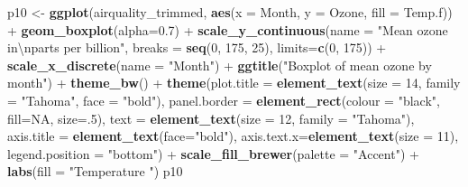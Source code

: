 \documentclass[]{article}
\newenvironment{Shaded}{\begin{snugshade}}{\end{snugshade}}
\newcommand{\KeywordTok}[1]{\textcolor[rgb]{0.13,0.29,0.53}{\textbf{{#1}}}}
\newcommand{\DataTypeTok}[1]{\textcolor[rgb]{0.13,0.29,0.53}{{#1}}}
\newcommand{\DecValTok}[1]{\textcolor[rgb]{0.00,0.00,0.81}{{#1}}}
\newcommand{\FloatTok}[1]{\textcolor[rgb]{0.00,0.00,0.81}{{#1}}}
\newcommand{\CharTok}[1]{\textcolor[rgb]{0.31,0.60,0.02}{{#1}}}
\newcommand{\StringTok}[1]{\textcolor[rgb]{0.31,0.60,0.02}{{#1}}}
\newcommand{\OtherTok}[1]{\textcolor[rgb]{0.56,0.35,0.01}{{#1}}}
\newcommand{\NormalTok}[1]{{#1}}
\begin{document}
\begin{Shaded}
\begin{Highlighting}[]
\NormalTok{p10 <-}\StringTok{ }\KeywordTok{ggplot}\NormalTok{(airquality_trimmed, }\KeywordTok{aes}\NormalTok{(}\DataTypeTok{x =} \NormalTok{Month, }\DataTypeTok{y =} \NormalTok{Ozone, }\DataTypeTok{fill =} \NormalTok{Temp.f)) +}\StringTok{ }
\StringTok{  }\KeywordTok{geom_boxplot}\NormalTok{(}\DataTypeTok{alpha=}\FloatTok{0.7}\NormalTok{) +}
\StringTok{  }\KeywordTok{scale_y_continuous}\NormalTok{(}\DataTypeTok{name =} \StringTok{"Mean ozone in}\CharTok{\textbackslash{}n}\StringTok{parts per billion"}\NormalTok{,}
    \DataTypeTok{breaks =} \KeywordTok{seq}\NormalTok{(}\DecValTok{0}\NormalTok{, }\DecValTok{175}\NormalTok{, }\DecValTok{25}\NormalTok{), }\DataTypeTok{limits=}\KeywordTok{c}\NormalTok{(}\DecValTok{0}\NormalTok{, }\DecValTok{175}\NormalTok{)) +}
\StringTok{  }\KeywordTok{scale_x_discrete}\NormalTok{(}\DataTypeTok{name =} \StringTok{"Month"}\NormalTok{) +}
\StringTok{  }\KeywordTok{ggtitle}\NormalTok{(}\StringTok{"Boxplot of mean ozone by month"}\NormalTok{) +}
\StringTok{  }\KeywordTok{theme_bw}\NormalTok{() +}
\StringTok{  }\KeywordTok{theme}\NormalTok{(}\DataTypeTok{plot.title =} \KeywordTok{element_text}\NormalTok{(}\DataTypeTok{size =} \DecValTok{14}\NormalTok{, }\DataTypeTok{family =} \StringTok{"Tahoma"}\NormalTok{, }\DataTypeTok{face =} \StringTok{"bold"}\NormalTok{), }
    \DataTypeTok{panel.border =} \KeywordTok{element_rect}\NormalTok{(}\DataTypeTok{colour =} \StringTok{"black"}\NormalTok{, }\DataTypeTok{fill=}\OtherTok{NA}\NormalTok{, }\DataTypeTok{size=}\NormalTok{.}\DecValTok{5}\NormalTok{),}
    \DataTypeTok{text =} \KeywordTok{element_text}\NormalTok{(}\DataTypeTok{size =} \DecValTok{12}\NormalTok{, }\DataTypeTok{family =} \StringTok{"Tahoma"}\NormalTok{),}
    \DataTypeTok{axis.title =} \KeywordTok{element_text}\NormalTok{(}\DataTypeTok{face=}\StringTok{"bold"}\NormalTok{),}
    \DataTypeTok{axis.text.x=}\KeywordTok{element_text}\NormalTok{(}\DataTypeTok{size =} \DecValTok{11}\NormalTok{),}
    \DataTypeTok{legend.position =} \StringTok{"bottom"}\NormalTok{) +}
\StringTok{  }\KeywordTok{scale_fill_brewer}\NormalTok{(}\DataTypeTok{palette =} \StringTok{"Accent"}\NormalTok{) +}
\StringTok{  }\KeywordTok{labs}\NormalTok{(}\DataTypeTok{fill =} \StringTok{"Temperature "}\NormalTok{)}
\NormalTok{p10}
\end{Highlighting}
\end{Shaded}
\end{document}
